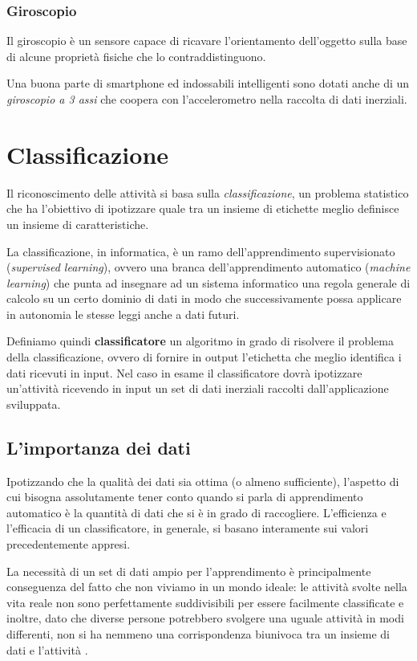 \subsubsection{Giroscopio}
Il giroscopio è un sensore capace di ricavare l'orientamento dell'oggetto sulla base di alcune proprietà fisiche che lo contraddistinguono.

Una buona parte di smartphone ed indossabili intelligenti sono dotati anche di un \textit{giroscopio a 3 assi} che coopera 
con l'accelerometro nella raccolta di dati inerziali.

\section{Classificazione}
Il riconoscimento delle attività si basa sulla \textit{classificazione}, un problema statistico che ha l'obiettivo di ipotizzare 
quale tra un insieme di etichette meglio definisce un insieme di caratteristiche. 

La classificazione, in informatica, è un ramo dell'apprendimento supervisionato (\textit{supervised learning}),
ovvero una branca dell'apprendimento automatico (\textit{machine learning}) che punta ad insegnare ad un sistema informatico una regola generale
di calcolo su un certo dominio di dati in modo che successivamente possa applicare in autonomia le stesse leggi anche a dati futuri.

Definiamo quindi \textbf{classificatore} un algoritmo in grado di risolvere il problema della classificazione, ovvero di fornire in output 
l'etichetta che meglio identifica i dati ricevuti in input.
Nel caso in esame il classificatore dovrà ipotizzare un'attività ricevendo in input un set di dati inerziali 
raccolti dall'applicazione sviluppata.

\subsection{L'importanza dei dati}
Ipotizzando che la qualità dei dati sia ottima (o almeno sufficiente), l'aspetto di cui bisogna assolutamente tener conto quando 
si parla di apprendimento automatico è la quantità di dati che si è in grado di raccogliere. 
L'efficienza e l'efficacia di un classificatore, in generale, si basano interamente sui valori precedentemente appresi.

La necessità di un set di dati ampio per l'apprendimento è principalmente conseguenza del fatto che non viviamo in un mondo ideale: 
le attività svolte nella vita reale non sono perfettamente suddivisibili per essere facilmente classificate e inoltre, dato che diverse persone
potrebbero svolgere una uguale attività in modi differenti, non si ha nemmeno una corrispondenza biunivoca tra un insieme di dati e l'attività \cite{framework_long_term_data_har}.




